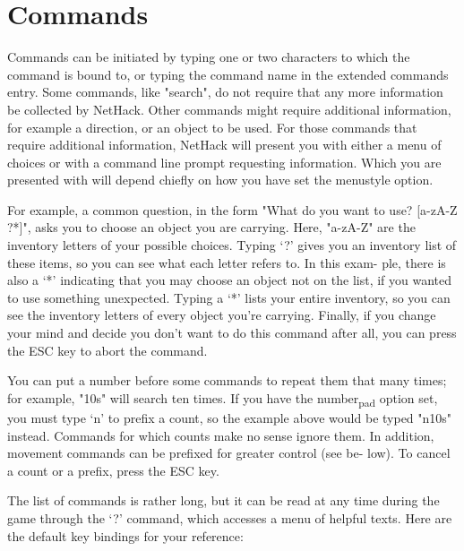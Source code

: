 \documentclass[11pt]{article}
\begin{document}
\section{Commands}
\label{sec:orgec4be61}

Commands can be initiated by typing one or two characters to which the
command is bound to, or typing the command name in  the extended
commands  entry.   Some commands, like "search", do not require that
any more information be collected by NetHack.  Other commands  might
require additional information, for example a direction, or an
object to be used.  For those  commands  that  require  additional
information, NetHack will present you with either a menu of choices
or with a command line  prompt  requesting information.  Which you are
presented with will depend chiefly on how you have set the menustyle
option.  

For example, a common question, in the  form  "What  do  you want  to
use? [a-zA-Z ?*]", asks you to choose an object you are
carrying. Here, "a-zA-Z" are the inventory letters of your  possible
choices. Typing `?' gives you an inventory list of these items, so you
can see what each letter refers to.  In this  exam- ple, there is also
a `*' indicating that you may choose an object not on the list, if you
wanted to use something unexpected.  Typing  a `*' lists your entire
inventory, so you can see the inventory letters of every object you're
carrying.   Finally,  if  you change your mind and decide you don't
want to do this command after all, you can press the ESC key to abort
the command.   

You can put a number before some  commands  to  repeat  them that
many  times;  for example, "10s" will search ten times.  If you have
the number\textsubscript{pad} option set, you must type `n' to prefix a count,  so
the example above would be typed "n10s" instead.  Commands for which
counts make no sense ignore them.   In  addition, movement  commands
can  be prefixed for greater control (see be- low).  To cancel a count
or a prefix, press the ESC key. 

The list of commands is rather long, but it can be  read  at any  time
during the game through the `?' command, which accesses a menu of
helpful texts.  Here are the default key  bindings  for your
reference: 
\end{document}
